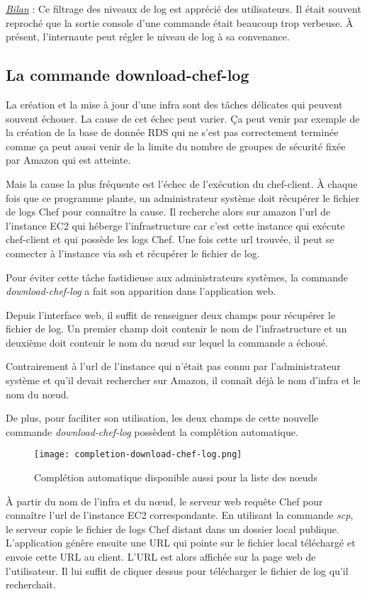 \underline{\textit{Bilan}} : Ce filtrage des niveaux de log est apprécié des
utilisateurs. Il était souvent reproché que la sortie console d'une commande
était beaucoup trop verbeuse. À présent, l'internaute peut régler le niveau de
log à sa convenance.

\subsection{La commande download-chef-log}
La création et la mise à jour d'une infra sont des tâches délicates qui peuvent
souvent échouer.
La cause de cet échec peut varier.
Ça peut venir par exemple de la création de la base de donnée RDS qui ne s'est
pas correctement terminée comme ça peut aussi venir de la limite du nombre de
groupes de sécurité fixée par Amazon qui est atteinte.

Mais la cause la plus fréquente est l'échec de l'exécution du chef-client.
À chaque fois que ce programme plante, un administrateur système doit récupérer le
fichier de logs Chef pour connaître la cause. Il recherche alors sur amazon
l'url de l'instance EC2 qui héberge l'infrastructure car c'est cette instance
qui exécute chef-client et qui possède les logs Chef. Une fois cette url
trouvée, il peut se connecter à l'instance via ssh et récupérer le fichier de
log.

Pour éviter cette tâche fastidieuse aux administrateurs systèmes, la commande
\textit{download-chef-log} a fait son apparition dans l'application web.

Depuis l'interface web, il suffit de renseigner deux champs pour récupérer le
fichier de log. Un premier champ doit contenir le nom de l'infrastructure et un
deuxième doit contenir le nom du nœud sur lequel la commande a échoué.

Contrairement à l'url de l'instance qui n'était pas connu par l'administrateur
système et qu'il devait rechercher sur Amazon, il connaît déjà le nom d'infra et
le nom du nœud.

De plus, pour faciliter son utilisation, les deux champs de cette nouvelle
commande \textit{download-chef-log} possèdent la complétion automatique.

\begin{figure}[H]
  \texttt{[image: completion-download-chef-log.png]}
  \caption{Complétion automatique disponible aussi pour la liste des nœuds}
\end{figure}

À partir du nom de l'infra et du nœud, le serveur web requête Chef pour
connaître l'url de l'instance EC2 correspondante. En utilisant la commande
\textit{scp}, le serveur copie le fichier de logs Chef distant dans un
dossier local publique.
L'application génère ensuite une URL qui pointe sur le fichier local téléchargé
et envoie cette URL au client.
L'URL est alors affichée sur la page web de l'utilisateur. Il lui suffit de
cliquer dessus pour télécharger le fichier de log qu'il recherchait.



